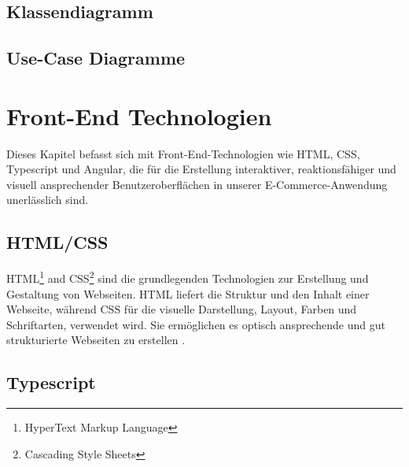 \subsection{Klassendiagramm}

\subsection{Use-Case Diagramme}


\section{Front-End Technologien}

Dieses Kapitel befasst sich mit Front-End-Technologien wie HTML, CSS, Typescript und Angular, die für die Erstellung interaktiver, reaktionsfähiger und visuell ansprechender Benutzeroberflächen in unserer E-Commerce-Anwendung unerlässlich sind.

\subsection{HTML/CSS}

HTML\footnote{HyperText Markup Language} and CSS\footnote{Cascading Style Sheets} sind die grundlegenden Technologien zur Erstellung und Gestaltung von Webseiten. HTML liefert die Struktur und den Inhalt einer Webseite, während CSS für die visuelle Darstellung, Layout, Farben und Schriftarten, verwendet wird. Sie ermöglichen es optisch ansprechende und gut strukturierte Webseiten zu erstellen \cite{HTML/CSS:2024}.

\subsection{Typescript}

